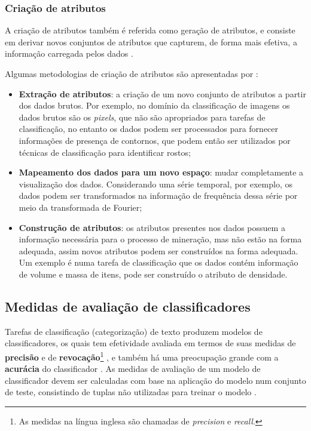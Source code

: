             
       \subsubsection{Criação de atributos} \label{subsubsec:Criação-de-atributos} 
            A criação de atributos também é referida como geração de atributos, e consiste em derivar novos conjuntos de atributos que capturem, de forma mais efetiva, a informação carregada pelos dados \cite[p.~55]{TanIDM2014}.
            
            Algumas metodologias de criação de atributos são apresentadas por :
            \begin{itemize}
                \item \textbf{Extração de atributos}: a criação de um novo conjunto de atributos a partir dos dados brutos.
                Por exemplo, no domínio da classificação de imagens os dados brutos são os \textit{pixels}, que não são apropriados para tarefas de classificação, no entanto os dados podem ser processados para fornecer informações de presença de contornos, que podem então ser utilizados por técnicas de classificação para identificar rostos;
                
                \item \textbf{Mapeamento dos dados para um novo espaço}: mudar completamente a visualização dos dados.
                Considerando uma série temporal, por exemplo, os dados podem ser transformados na informação de frequência dessa série por meio da transformada de Fourier;
                
                \item \textbf{Construção de atributos}: os atributos presentes nos dados possuem a informação necessária para o processo de mineração, mas não estão na forma adequada, assim novos atributos podem ser construídos na forma adequada. 
                Um exemplo é numa tarefa de classificação que os dados contém informação de volume e massa de itens, pode ser construído o atributo de densidade.
            \end{itemize}
            
        
    \subsection{Medidas de avaliação de classificadores} \label{subsec:Medidas-de-avaliação-de-classificadores}
        Tarefas de classificação (categorização) de texto produzem modelos de classificadores, os quais tem efetividade avaliada em termos de suas medidas de \textbf{precisão} e de \textbf{revocação}\footnote{As medidas na língua inglesa são chamadas de \textit{precision} e \textit{recall}.} \cite[p.~48]{Berry2010TMAT}, e também há uma preocupação grande com a \textbf{acurácia} do classificador \cite[p.~313]{Zhai2016TDMA}.
        As medidas de avaliação de um modelo de classificador devem ser calculadas com base na aplicação do modelo num conjunto de teste, consistindo de tuplas não utilizadas para treinar o modelo \cite[p.~364]{Han:2011:DMC:1972541}.
        
